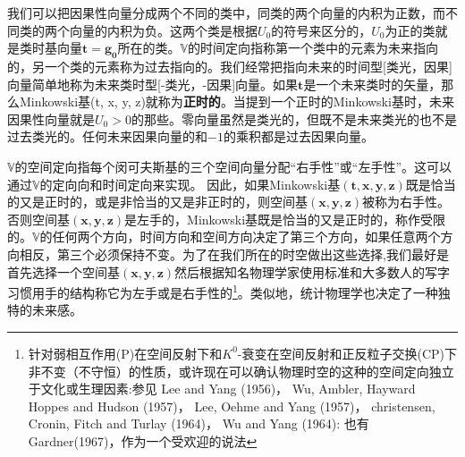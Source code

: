 \documentclass[utf8]{ctexbook}
\numberwithin{equation}{section}
\begin{document}
我们可以把因果性向量分成两个不同的类中，同类的两个向量的内积为正数，而不同类的两个向量的内积为负。这两个类是根据$U_0$的符号来区分的，$U_0$为正的类就是类时基向量$\mathbf{t=g_0}$所在的类。$\mathbb{V}$的时间定向指称第一个类中的元素为未来指向的，另一个类的元素称为过去指向的。我们经常把指向未来的时间型[类光，因果]向量简单地称为未来类时型[-类光，-因果]向量。如果$\mathbf{t}$是一个未来类时的矢量，那么Minkowski基(t, x, y, z)就称为\textbf{正时的}。当提到一个正时的Minkowski基时，未来因果性向量就是$U_0 > 0$的那些。零向量虽然是类光的，但既不是未来类光的也不是过去类光的。任何未来因果向量的和$-1$的乘积都是过去因果向量。

$\mathbb{V}$的空间定向指每个闵可夫斯基的三个空间向量分配“右手性”或“左手性”。这可以通过$\mathbb{V}$的定向向和时间定向来实现。
因此，如果Minkowski基$\mathbf{(t,x,y,z)}$既是恰当的又是正时的，或是非恰当的又是非正时的，则空间基$\mathbf{(x, y, z)}$被称为右手性。否则空间基$\mathbf{(x, y, z)}$是左手的，Minkowski基既是恰当的又是正时的，称作受限的。$\mathbb{V}$的任何两个方向，时间方向和空间方向决定了第三个方向，如果任意两个方向相反，第三个必须保持不变。为了在我们所在的时空做出这些选择,我们最好是首先选择一个空间基$\mathbf{(x, y, z)}$然后根据知名物理学家使用标准和大多数人的写字习惯用手的结构称它为左手或是右手性的\footnote{针对弱相互作用(P)在空间反射下和$K^0$-衰变在空间反射和正反粒子交换(CP)下非不变（不守恒）的性质，或许现在可以确认物理时空的这种的空间定向独立于文化或生理因素:参见
Lee and Yang (1956)， Wu, Ambler, Hayward Hoppes and Hudson (1957)， Lee, Oehme and Yang (1957)， christensen, Cronin, Fitch and Turlay (1964)， Wu and Yang (1964):
也有Gardner(1967)，作为一个受欢迎的说法}。类似地，统计物理学也决定了一种独特的未来感。
\end{document}

